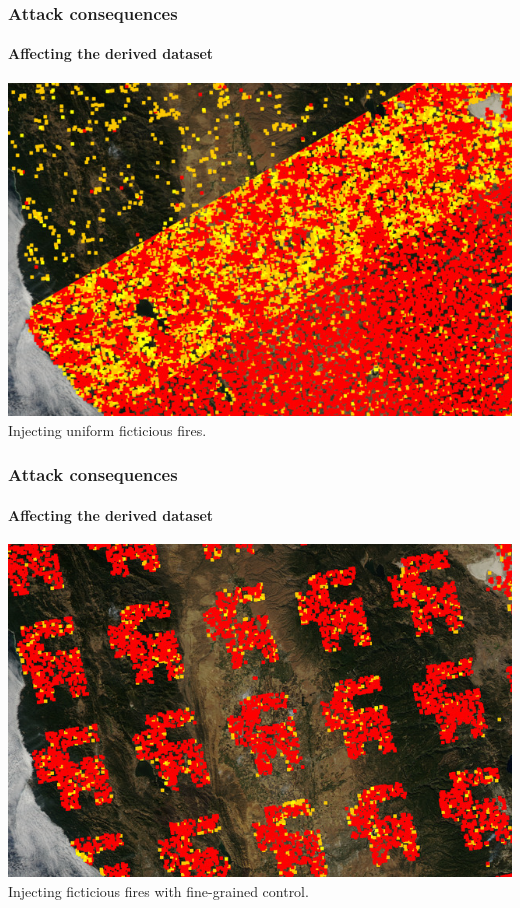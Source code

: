 \documentclass{beamer}
\begin{document}
\begin{frame}
  \frametitle{Attack consequences}
  \framesubtitle{Affecting the derived dataset}
  \includegraphics[width=\textwidth]{images/injection/random_combined_diagonal.jpg}
  \newline
  \centering
  Injecting uniform ficticious fires.
\end{frame}

\begin{frame}
  \frametitle{Attack consequences}
  \framesubtitle{Affecting the derived dataset}
  \includegraphics[width=\textwidth]{images/injection/amogi.jpg}
  \newline
  \centering
  Injecting ficticious fires with fine-grained control.
\end{frame}
\end{document}
